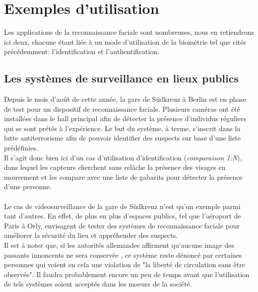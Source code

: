 \section{Exemples d'utilisation}
Les applications de la reconnaissance faciale sont nombreuses, nous en retiendrons ici deux, chacune étant liée à un mode d'utilisation de la biométrie tel que cités précédemment: l'identification et l'authentification.
\subsection{Les systèmes de surveillance en lieux publics}
Depuis le mois d'août de cette année, la gare de Südkreuz à Berlin est en phase de test pour un dispositif de reconnaissance faciale. Plusieurs caméras ont été installées dans le hall principal afin de détecter la présence d'individus réguliers qui se sont prétés à l'expérience. Le but du système, à terme, s'inscrit dans la lutte antiterrorisme afin de pouvoir identifier des suspects sur base d'une liste prédéfinies.
\\
Il s'agit donc bien ici d'un cas d'utilisation d'identification (\textit{comparaison 1:N}), dans lequel les capteurs cherchent sans relâche la présence des visages en mouvement et les compare avec une liste de gabarits pour détecter la présence d'une personne.
\paragraph{}
Le cas de videosurveillance de la gare de Südkreuz n'est qu'un exemple parmi tant d'autres. En effet, de plus en plus d'espaces publics, tel que l'aéroport de Paris à Orly, envisagent de tester des systèmes de reconnaissance faciale pour améliorer la sécurité du lieu et appréhender des suspects.
\\
Il est à noter que, si les autorités allemandes affirment qu'aucune image des passants innoncents ne sera conservée \cite{Xmisc_6}, ce système reste dénoncé par certaines personnes qui voient en cela une violation de "la liberté de circulation sans être observée". Il faudra probablement encore un peu de temps avant que l'utilisation de tels systèmes soient acceptés dans les moeurs de la société.

